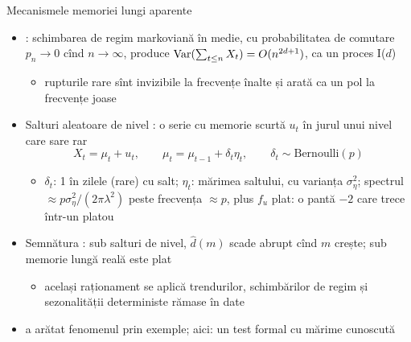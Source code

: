 \begin{frame}{Mecanismele memoriei lungi aparente}
\itemsize{\small}
\begin{itemize}
    \item {}: schimbarea de regim markoviană în medie, cu probabilitatea de comutare $p_n \to 0$ cînd $n \to \infty$, produce $\text{Var}(\sum_{t\le n}X_t) = O(n^{2d+1})$, ca un proces I($d$)
    \begin{itemize}
        \item rupturile rare sînt invizibile la frecvențe înalte și arată ca un pol la frecvențe joase 
    \end{itemize}
    \item Salturi aleatoare de nivel : o serie cu memorie scurtă $u_t$ în jurul unui nivel care sare rar
    \[ X_t = \mu_t + u_t, \qquad \mu_t = \mu_{t-1} + \delta_t\eta_t, \qquad \delta_t \sim \mathrm{Bernoulli}(p) \]
    \begin{itemize}
        \item $\delta_t$: 1 în zilele (rare) cu salt; $\eta_t$: mărimea saltului, cu varianța $\sigma^2_\eta$; spectrul $\approx p\sigma_\eta^2/(2\pi\lambda^2)$ peste frecvența $\approx p$, plus $f_u$ plat: o pantă $-2$ care trece într-un platou
    \end{itemize}
    \item Semnătura : sub salturi de nivel, $\hat d(m)$ scade abrupt cînd $m$ crește; sub memorie lungă reală este plat
    \begin{itemize}
        \item același raționament se aplică trendurilor, schimbărilor de regim și sezonalității deterministe rămase în date
    \end{itemize}
    \item {} a arătat fenomenul prin exemple; aici: un test formal cu mărime cunoscută
\end{itemize}
\end{frame}

